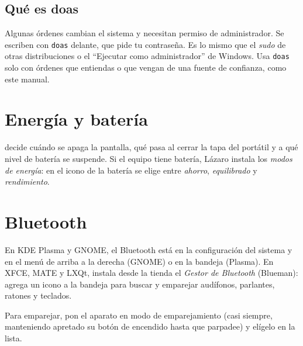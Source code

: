 \subsection{Qué es doas}
Algunas órdenes cambian el sistema y necesitan permiso de administrador.
Se escriben con \texttt{doas} delante, que pide tu contraseña. Es lo mismo
que el \emph{sudo} de otras distribuciones o el \enquote{Ejecutar como
administrador} de Windows. Usa \texttt{doas} solo con órdenes que
entiendas o que vengan de una fuente de confianza, como este manual.

\section{Energía y batería}

 decide cuándo se apaga la
pantalla, qué pasa al cerrar la tapa del portátil y a qué nivel de batería
se suspende. Si el equipo tiene batería, Lázaro instala los \emph{modos de
energía}: en el icono de la batería se elige entre \emph{ahorro},
\emph{equilibrado} y \emph{rendimiento}.

\section{Bluetooth}

En KDE Plasma y GNOME, el Bluetooth está en la configuración del sistema y
en el menú de arriba a la derecha (GNOME) o en la bandeja (Plasma). En
XFCE, MATE y LXQt, instala desde la tienda el \emph{Gestor de Bluetooth}
(Blueman): agrega un icono a la bandeja para buscar y emparejar
audífonos, parlantes, ratones y teclados.

Para emparejar, pon el aparato en modo de emparejamiento (casi siempre,
manteniendo apretado su botón de encendido hasta que parpadee) y elígelo
en la lista.

\fuentes
